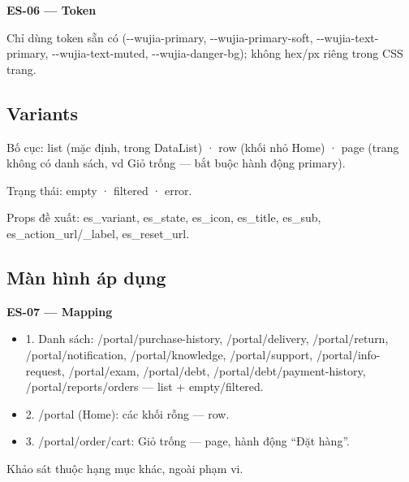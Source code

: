 \documentclass[11pt,a4paper]{report}
\begin{document}
\par\smallskip\textbf{ES-06 — Token}\par
Chỉ dùng token sẵn có (-\kern0pt-\allowbreak{}wujia-\allowbreak{}primary, -\kern0pt-\allowbreak{}wujia-\allowbreak{}primary-\allowbreak{}soft, -\kern0pt-\allowbreak{}wujia-\allowbreak{}text-\allowbreak{}primary, -\kern0pt-\allowbreak{}wujia-\allowbreak{}text-\allowbreak{}muted, -\kern0pt-\allowbreak{}wujia-\allowbreak{}danger-\allowbreak{}bg); không hex/\allowbreak{}px riêng trong CSS trang.\par
\subsection*{Variants}
Bố cục: list (mặc định, trong DataList) · row (khối nhỏ Home) · page (trang không có danh sách, vd Giỏ trống — bắt buộc hành động primary).\par
Trạng thái: empty · filtered · error.\par
Props đề xuất: es\_variant, es\_state, es\_icon, es\_title, es\_sub, es\_action\_url/\allowbreak{}\_label, es\_reset\_url.\par
\subsection*{Màn hình áp dụng}
\par\smallskip\textbf{ES-07 — Mapping}\par
\begin{itemize}[label={}]
\item 1. Danh sách: /portal/\allowbreak{}purchase-\allowbreak{}history, /portal/\allowbreak{}delivery, /portal/\allowbreak{}return, /portal/\allowbreak{}notification, /portal/\allowbreak{}knowledge, /portal/\allowbreak{}support, /portal/\allowbreak{}info-\allowbreak{}request, /portal/\allowbreak{}exam, /portal/\allowbreak{}debt, /portal/\allowbreak{}debt/\allowbreak{}payment-\allowbreak{}history, /portal/\allowbreak{}reports/\allowbreak{}orders — list + empty/\allowbreak{}filtered.
\item 2. /portal (Home): các khối rỗng — row.
\item 3. /portal/\allowbreak{}order/\allowbreak{}cart: Giỏ trống — page, hành động “Đặt hàng”.
\end{itemize}
Khảo sát thuộc hạng mục khác, ngoài phạm vi.\par
\end{document}
